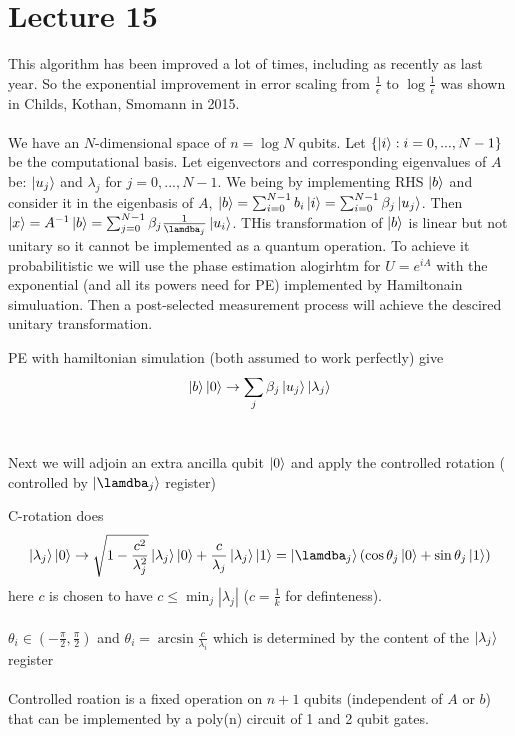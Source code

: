\documentclass{article}
\begin{document}
\section{Lecture 15}
This algorithm has been improved a lot of times, including as recently as last year. So the exponential improvement in error scaling from $\frac{1}{\epsilon}$ to $\log \frac{1}{\epsilon}$ was shown in Childs, Kothan, Smomann in 2015.\\\\
We have an $N$-dimensional space of $n = \log N$ qubits. Let $\{\ket{i} : i = 0,..., N-1\}$ be the computational basis. Let eigenvectors and corresponding eigenvalues of $A$ be: $\ket{u_j} $ and $\lambda_j$ for $j = 0,...,N-1$. We being by implementing RHS $\ket{b}$ and consider it in the eigenbasis of $A$, $\ket{b} = \sum_{i=0}^{N-1} b_i \ket{i} = \sum_{i=0}^{N-1} \beta_j \ket{u_j}$. Then $\ket{x} = A^{-1} \ket{b} = \sum_{j=0}^{N-1} \beta_j \frac{1}{\lamdba_j} \ket{u_i}$. THis transformation of $\ket{b}$ is linear  but not unitary so it cannot be implemented as a quantum operation. To achieve it probabilitistic we will use the phase estimation alogirhtm for $U= e^{iA}$ with the exponential (and all its powers need for PE) implemented by Hamiltonain simuluation. Then a post-selected measurement process will achieve the descired unitary transformation.\begin{itemlist}\item  PE with hamiltonian simulation (both assumed to work perfectly) give $$\ket{b} \ket{0} \rightarrow \sum_j \beta_j \ket{u_j} \ket{\lambda_j}$$\\
                \item Next we will adjoin an extra ancilla qubit $\ket{0}$ and apply the controlled rotation ( controlled by $\ket{\lamdba_j}$ register)\\
                \item C-rotation does 
                        $$
                        \ket{\lambda_j} \ket{0} \rightarrow \sqrt{1 - \frac{c^2}{\lambda^2_j}} \ket{\lambda_j} \ket{0} + \frac{c}{\lambda_j} \ket{\lambda_j} \ket{1} = \ket{\lamdba_j}( \cos \theta_j \ket{0} + \sin \theta_j \ket{1})
                        $$
                        here $c$ is chosen to have $c \leq \min_j |\lambda_j|$  ($c = \frac{1}{k}$ for definteness).\\\\ $\theta_i \in (- \frac{\pi}{2}, \frac{\pi}{2})$ and $\theta_i = \arcsin \frac{c}{\lambda_i}$ which is determined by the content of the $\ket{\lambda_j}$ register\\\\Controlled roation is a fixed operation on $n+1$ qubits (independent of $A$ or $b$) that can be implemented by a poly(n) circuit of 1 and 2 qubit gates.\\

\end{itemlist}
\end{document}
